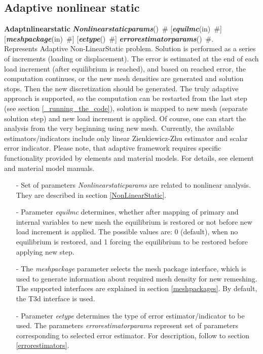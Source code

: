\documentclass[draft]{article}
\newcommand{\param}[1]{{\em #1}}
\newcommand{\keywordnotype}[1]{\mbox{{\it{\bf{#1}}}}}
\newcommand{\keyword}[2]{\mbox{{\keywordnotype{#1}\tiny (#2)}}}
\newcommand{\entKeywordInst}[1]{\mbox{{\bf{{#1}}}}}
\newcommand{\field}[2]{\mbox{\keyword{#1}{#2}~\#}}
\newcommand{\optField}[2]{\mbox{[\field{#1}{#2}]}}
\begin{document}
\subsection{Adaptive nonlinear static}
\entKeywordInst{Adaptnlinearstatic} \field{Nonlinearstaticparams}{} \optField{equilmc}{in}\\ \optField{meshpackage}{in}
\optField{eetype}{} \field{errorestimatorparams}{}.\\
Represents Adaptive Non-LinearStatic problem. Solution is performed  as a series of increments (loading or displacement).
The error is estimated at the end of each load increment (after
equilibrium is reached), and based on reached error, the computation
continues, or the new mesh densities are generated and solution
stops. Then the new discretization should be generated. 
The truly adaptive approach is supported, so the computation can be
restarted from the last step (see section \ref{_running_the_code}), solution is mapped to new mesh (separate
solution step) and new load increment is applied. Of course, one can start the analysis from
the very beginning using new mesh. Currently, the available
estimators/indicators include only linear 
Zienkiewicz-Zhu estimator and scalar error indicator. Please note, that adaptive framework requires
specific functionality provided by elements and material models. For
details, see element and material model manuals.
\begin{itemize}
\item[-]
Set of parameters \param{Nonlinearstaticparams} are related to
nonlinear analysis. They are described in section
\ref{NonLinearStatic}.
\item[-]
Parameter \param{equilmc} determines, whether after mapping of primary
and internal variables to new mesh the equilibrium is restored or not
before new load increment is applied. The possible values are: 0
(default), when no equilibrium is restored, and 1 forcing the
equilibrium to be restored before applying new step.
\item[-]
The \param{meshpackage} parameter selects the mesh package interface,
which is used to generate information about required mesh density for
new remeshing. The supported interfaces are explained in section
\ref{meshpackages}. By default, the T3d interface is used.
\item[-]
Parameter \param{eetype} determines the type of error
estimator/indicator to be used. The parameters
\param{errorestimatorparams} represent set of parameters corresponding
to selected error estimator. For description, follow to section
\ref{errorestimators}.
\end{itemize}
%
\end{document}
